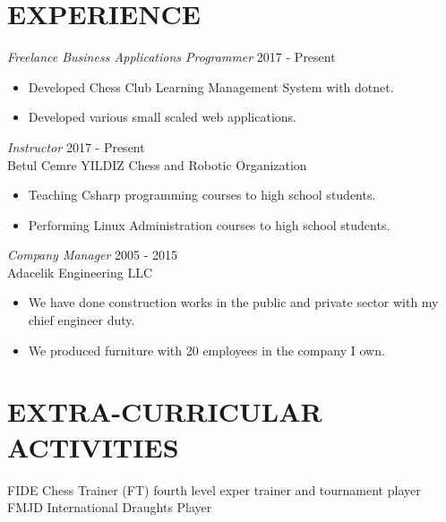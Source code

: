 \documentclass[line,margin]{res}
\begin{document}
\begin{resume}
\begin{itemize}
\section{EXPERIENCE} {\sl Freelance Business Applications Programmer} \hfill  2017 - Present \\
                 \begin{itemize}  \itemsep -2pt %
                 \item Developed Chess Club Learning Management System with dotnet.
                \item   Developed various small scaled web applications.
                \end{itemize}
 
                {\sl  Instructor} \hfill             2017 - Present \\
                Betul Cemre YILDIZ Chess and Robotic Organization
                 \begin{itemize}  \itemsep -2pt %
                 \item Teaching Csharp programming courses to high school students.
                 \item Performing  Linux Administration courses to high school students.
                 \end{itemize} 

                 
                {\sl Company Manager} \hfill        2005 - 2015 \\
                Adacelik Engineering LLC
                  \begin{itemize}
                   \item We have done construction works in the public and private sector with my chief engineer duty.
                     
                   \item We produced furniture with 20 employees in the company I own.
                   \end{itemize} 
 
\section{EXTRA-CURRICULAR \\ ACTIVITIES}             
                FIDE Chess Trainer (FT) fourth level exper trainer and tournament player \\
                FMJD International Draughts Player \\
                


\end{itemize}
\end{resume}
\end{document}
